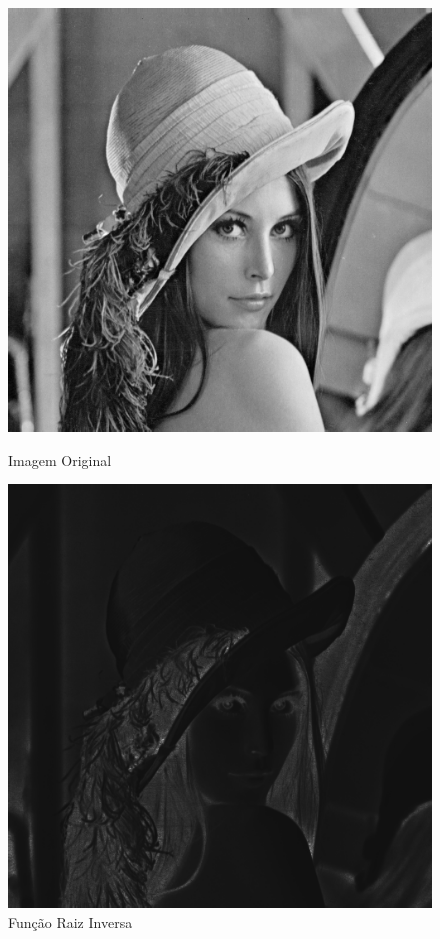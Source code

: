 \documentclass{article}
\begin{document}
\newpage
\begin{figure}[!htb]
\begin{minipage}[b]{0.45\linewidth}
\centering
\includegraphics[scale=0.32]{lena_B.png}
\caption{Imagem Original}
\label{fig:original}
\end{minipage}
\hspace{0.5cm}
\begin{minipage}[b]{0.45\linewidth}
\centering
\includegraphics[scale=0.32]{TransNLinearRootInv.png}
\caption{Função Raiz Inversa}
\label{fig:rota}
\end{minipage}
\end{figure}
\end{document}
